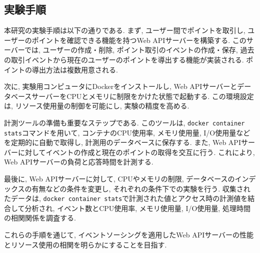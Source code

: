 \documentclass[../../../main]{subfiles}
\begin{document}
    \subsection{実験手順}\label{subsec:method-procedure}

    本研究の実験手順は以下の通りである. まず, ユーザー間でポイントを取引し, ユーザーのポイントを確認できる機能を持つWeb APIサーバーを構築する. このサーバーでは, ユーザーの作成・削除, ポイント取引のイベントの作成・保存, 過去の取引イベントから現在のユーザーのポイントを導出する機能が実装される. ポイントの導出方法は複数用意される.

    次に, 実験用コンピュータにDockerをインストールし, Web APIサーバーとデータベースサーバーをCPUとメモリに制限をかけた状態で起動する. この環境設定は, リソース使用量の制御を可能にし, 実験の精度を高める.

    計測ツールの準備も重要なステップである. このツールは, \texttt{docker container stats}コマンドを用いて, コンテナのCPU使用率, メモリ使用量, I/O使用量などを定期的に自動で取得し, 計測用のデータベースに保存する. また, Web APIサーバーに対してイベントの作成と現在のポイントの取得を交互に行う. これにより, Web APIサーバーの負荷と応答時間を計測する.

    最後に, Web APIサーバーに対して, CPUやメモリの制限, データベースのインデックスの有無などの条件を変更し, それぞれの条件下での実験を行う. 収集されたデータは, \texttt{docker container stats}で計測された値とアクセス時の計測値を結合して分析され, イベント数とCPU使用率, メモリ使用量, I/O使用量, 処理時間の相関関係を調査する.

    これらの手順を通じて, イベントソーシングを適用したWeb APIサーバーの性能とリソース使用の相関を明らかにすることを目指す.
\end{document}
